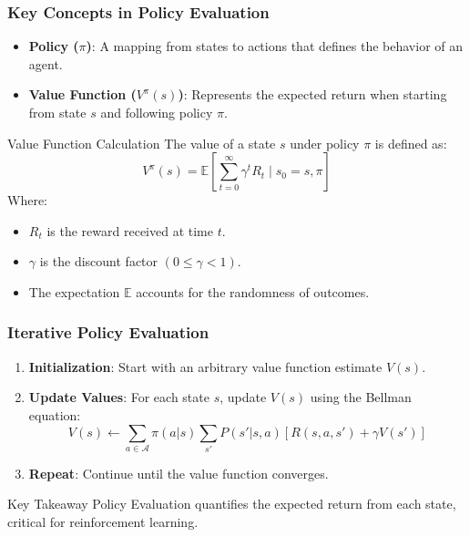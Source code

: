 \documentclass[aspectratio=169]{beamer}
\begin{document}
\begin{frame}[fragile]
    \frametitle{Key Concepts in Policy Evaluation}
    \begin{itemize}
        \item \textbf{Policy (\( \pi \))}: A mapping from states to actions that defines the behavior of an agent.
        \item \textbf{Value Function (\( V^\pi(s) \))}: Represents the expected return when starting from state \( s \) and following policy \( \pi \).
    \end{itemize}

    \begin{block}{Value Function Calculation}
        The value of a state \( s \) under policy \( \pi \) is defined as:
        \begin{equation}
            V^\pi(s) = \mathbb{E} \left[ \sum_{t=0}^{\infty} \gamma^t R_t \mid s_0 = s, \pi \right]
        \end{equation}
        Where:
        \begin{itemize}
            \item \( R_t \) is the reward received at time \( t \).
            \item \( \gamma \) is the discount factor \((0 \leq \gamma < 1)\).
            \item The expectation \( \mathbb{E} \) accounts for the randomness of outcomes.
        \end{itemize}
    \end{block}
\end{frame}

\begin{frame}[fragile]
    \frametitle{Iterative Policy Evaluation}
    \begin{enumerate}
        \item \textbf{Initialization}: Start with an arbitrary value function estimate \( V(s) \).
        \item \textbf{Update Values}: For each state \( s \), update \( V(s) \) using the Bellman equation:
        \begin{equation}
            V(s) \leftarrow \sum_{a \in \mathcal{A}} \pi(a|s) \sum_{s'} P(s'|s, a) [R(s, a, s') + \gamma V(s')]
        \end{equation}
        \item \textbf{Repeat}: Continue until the value function converges.
    \end{enumerate}

    \begin{block}{Key Takeaway}
        Policy Evaluation quantifies the expected return from each state, critical for reinforcement learning.
    \end{block}
\end{frame}
\end{document}
